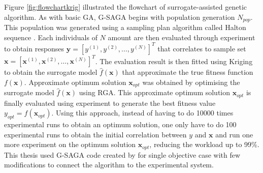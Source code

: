 Figure \ref{fig:flowchartkrig} illustrated the flowchart of surrogate-assisted genetic algorithm. As with basic GA, G-SAGA begins with population generation $N_{pop}$. This population was generated using a sampling plan algorithm called Halton sequence \citep{bimo}. Each individuals of $N$ amount are then evaluated through experiment to obtain responses $\mathbf{y} = [y^{(1)}, y^{(2)}, \ldots, y^{(N)}]^{T}$ that correlates to sample set $\mathbf{x} = [\mathbf{x}^{(1)}, \mathbf{x}^{(2)}, \ldots, \mathbf{x}^{(N)}]^{T}$. The evaluation result is then fitted using Kriging to obtain the surrogate model $\hat{f}(\mathbf{x})$ that approximate the true fitness function $f(\mathbf{x})$. Approximate optimum solution $\mathbf{x}_{opt}$ was obtained by optimising the surrogate model $\hat{f}(\mathbf{x})$ using RGA. This approximate optimum solution $\mathbf{x}_{opt}$ is finally evaluated using experiment to generate the best fitness value $y_{opt} = f(\mathbf{x}_{opt})$. Using this approach, instead of having to do 10000 times experimental runs to obtain an optimum solution, one only have to do 100 experimental runs to obtain the initial correlation between $y$ and $\mathbf{x}$ and run one more experiment on the optimum solution $\mathbf{x}_{opt}$, reducing the workload up to 99\%. This thesis used G-SAGA code created by \citet{bimo} for single objective case with few modifications to connect the algorithm to the experimental system.
